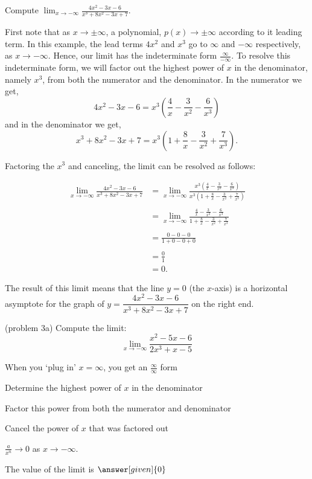\documentclass{ximera}
\begin{document}
\begin{example}[example 3]
Compute $\displaystyle{\lim_{x \to -\infty} \frac{4x^2 - 3x - 6}{x^3 +8x^2 -3x + 7}}.$

First note that as $x\to \pm \infty$, a polynomial, $p(x) \to \pm \infty$ according to it leading term.
In this example, the lead terms $4x^2$ and $x^3$  go to $\infty$ and $-\infty$ respectively, as $x \to -\infty$. 
Hence, our limit has the indeterminate form
$\frac{\infty}{-\infty}$.
To resolve this indeterminate form, we will factor out 
the highest power of $x$ in the denominator, namely $x^3$, from both the numerator and the denominator.  
In the numerator we get, 
\[4x^2 - 3x - 6 = x^3(\frac{4}{x} - \frac{3}{x^2} - \frac{6}{x^3})\]
and in the denominator we get,
\[x^3 +8x^2 -3x + 7 = x^3(1 +  \frac{8}{x} - \frac{3}{x^2} + \frac{7}{x^3}).\]

Factoring the $x^3$ and canceling, the limit can be resolved as follows:

\begin{align*}
\lim_{x \to -\infty}\frac{4x^2 - 3x - 6}{x^3 +8x^2 -3x + 7} &= 
\lim_{x \to -\infty} \frac{x^3(\frac{4}{x}-\frac{3}{x^2} -\frac{6}{x^3})}
{x^3(1 + \frac{8}{x}-\frac{3}{x^2}+\frac{7}{x^3})} \\ \\
&=\lim_{x \to -\infty} \frac{\frac{4}{x}-\frac{3}{x^2} -\frac{6}{x^3}}{1 + \frac{8}{x}-\frac{3}{x^2}+\frac{7}{x^3}} \\ \\
&=\frac{0 - 0 - 0}{1 +0- 0 + 0} \\ \\
&= \frac01 \\
&= 0.
\end{align*}

The result of this limit means that the line $y = 0$ (the $x$-axis) is a horizontal asymptote
for the graph of $y = \dfrac{4x^2 - 3x - 6}{x^3 +8x^2 -3x + 7}$ on the right end.
\end{example}


\begin{problem}(problem 3a)
  Compute the limit:
  \[
  \lim_{x \to -\infty} \frac{x^2 - 5x - 6}{2x^3 + x -5}
  \]
  
    \begin{hint}
      When you `plug in' $x = \infty$, you get an $\frac{\infty}{\infty}$ form
    \end{hint}
    \begin{hint}
      Determine the highest power of $x$ in the denominator
    \end{hint}
    \begin{hint}
      Factor this power from both the numerator and denominator
    \end{hint}
    \begin{hint}
      Cancel the power of $x$ that was factored out
    \end{hint}
    \begin{hint}
      $\frac{a}{x^n} \to 0$ as $x \to -\infty$.
    \end{hint}
		The value of the limit is
		 $\answer[given]{0}$
		
\end{problem}
\end{document}

